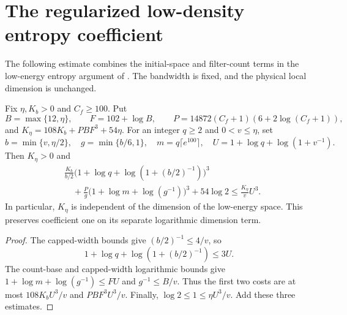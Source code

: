 \section{The regularized low-density entropy coefficient}

The following estimate combines the initial-space and filter-count terms
in the low-energy entropy argument of \cite{Arad2016RigorousRG}. The
bandwidth is fixed, and the physical local dimension is unchanged.

\begin{lemma}
    \label{lem:low_density_entropy_cost}
    \leanok
    Fix $\eta,K_b>0$ and $C_f\ge100$. Put
    \[
        B=\max\{12,\eta\},\qquad F=102+\log B,\qquad
        P=14872(C_f+1)(6+2\log(C_f+1)),
    \]
    and $K_\eta=108K_b+PBF^3+54\eta$. For an integer $q\ge2$
    and $0<v\le\eta$, set
    \[
        b=\min\{v,\eta/2\},\quad g=\min\{b/6,1\},\quad
        m=q\lceil e^{100}\rceil,\quad
        U=1+\log q+\log(1+v^{-1}).
    \]
    Then $K_\eta>0$ and
    \begin{align*}
         & \frac{K_b}{b/2}\bigl(1+\log q+\log(1+(b/2)^{-1})\bigr)^3 \\
         & \quad+\frac P g\bigl(1+\log m+\log(g^{-1})\bigr)^3
        +54\log2
        \le\frac{K_\eta}{v}U^3.
    \end{align*}
    In particular, $K_\eta$ is independent of the dimension of the
    low-energy space. This preserves coefficient one on its separate
    logarithmic dimension term.
\end{lemma}
\begin{proof}\leanok
    The capped-width bounds give $(b/2)^{-1}\le4/v$, so
    \[
        1+\log q+\log(1+(b/2)^{-1})\le3U.
    \]
    The count-base and capped-width logarithmic bounds give
    $1+\log m+\log(g^{-1})\le FU$ and $g^{-1}\le B/v$.
    Thus the first two costs are at most $108K_bU^3/v$ and
    $PBF^3U^3/v$. Finally, $\log2\le1\le\eta U^3/v$.
    Add these three estimates.
\end{proof}

